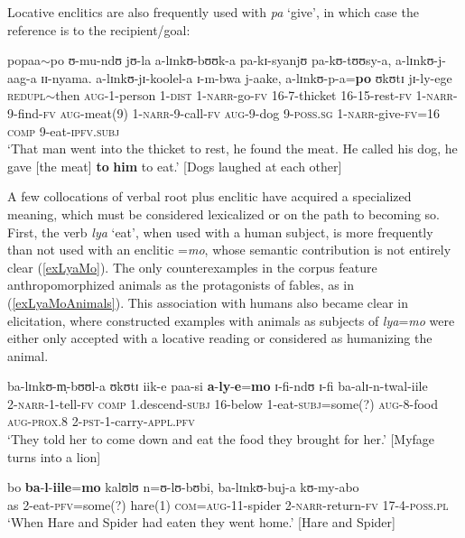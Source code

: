 Locative enclitics are also frequently used with \textit{pa} \lq give', in which case the reference is to the recipient/goal:
\begin{exe}
	\ex \gll popaa$\sim$po ʊ-mu-ndʊ jʊ-la a-lɪnkʊ-bʊʊk-a pa-kɪ-syanjʊ pa-kʊ-tʊʊsy-a, a-lɪnkʊ-j-aag-a ɪɪ-nyama. a-lɪnkʊ-jɪ-koolel-a ɪ-m-bwa j-aake, a-lɪnkʊ-p-a=\textbf{po} ʊkʊtɪ jɪ-ly-ege\\
	\textsc{redupl}$\sim$then \textsc{aug}-1-person 1-\textsc{dist} 1-\textsc{narr}-go-\textsc{fv} 16-7-thicket 16-15-rest-\textsc{fv} 1-\textsc{narr}-9-find-\textsc{fv} \textsc{aug}-meat(9) 1-\textsc{narr}-9-call-\textsc{fv} \textsc{aug}-9-dog 9-\textsc{poss.sg} 1-\textsc{narr}-give-\textsc{fv}=16 \textsc{comp} 9-eat-\textsc{ipfv.subj}\\
	\glt `That man went into the thicket to rest, he found the meat. He called his dog, he gave [the meat] \textbf{to} \textbf{him} to eat.' [Dogs laughed at each other]
\end{exe}

A few collocations of verbal root plus enclitic have acquired a specialized meaning, which must be considered lexicalized or on the path to becoming so. First, the verb \textit{lya} `eat', when used with a human subject, is more frequently than not used with an enclitic \mbox{=\textit{mo}}, whose semantic contribution is not entirely clear (\ref{exLyaMo}). The only counterexamples in the corpus feature anthropomorphized animals as the protagonists of fables, as in (\ref{exLyaMoAnimals}). This association with humans also became clear in elicitation, where constructed examples with animals as subjects of \textit{lya}=\textit{mo} were either only accepted with a locative reading or considered as humanizing the animal.
\begin{exe}
	\ex \label{exLyaMo} 
	\gll ba-lɪnkʊ-m̩-bʊʊl-a ʊkʊtɪ iik-e paa-si \textbf{a}-\textbf{ly}-\textbf{e}=\textbf{mo} ɪ-fi-ndʊ ɪ-fi ba-alɪ-n-twal-iile\\
	2-\textsc{narr}-1-tell-\textsc{fv} \textsc{comp} 1.descend-\textsc{subj} 16-below 1-eat-\textsc{subj}=some(?) \textsc{aug}-8-food \textsc{aug}-\textsc{prox.8} 2-\textsc{pst}-1-carry-\textsc{appl.pfv}\\
	\glt \lq They told her to come down and eat the food they brought for her.' [Myfage turns into a lion] 
	
	
	\ex \label{exLyaMoAnimals}\gll bo \textbf{ba}-\textbf{l}-\textbf{iile}=\textbf{mo} kalʊlʊ n=ʊ-lʊ-bʊbi, ba-lɪnkʊ-buj-a kʊ-my-abo\\
	as 2-eat-\textsc{pfv}=some(?) hare(1) \textsc{com}=\textsc{aug}-11-spider 2-\textsc{narr}-return-\textsc{fv} 17-4-\textsc{poss.pl}\\
	\glt `When Hare and Spider had eaten they went home.' [Hare and Spider]
\end{exe}


